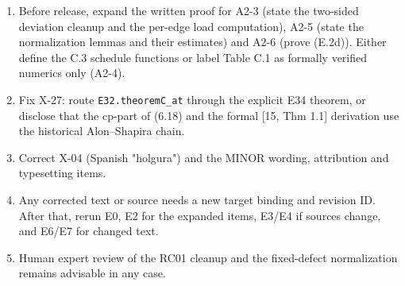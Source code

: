 \documentclass[
]{article}
\providecommand{\tightlist}{%
  \setlength{\itemsep}{0pt}\setlength{\parskip}{0pt}}
\begin{document}
\begin{enumerate}
\def\labelenumi{\arabic{enumi}.}
\tightlist
\item
  Before release, expand the written proof for A2-3 (state the two-sided
  deviation cleanup and the per-edge load computation), A2-5 (state the
  normalization lemmas and their estimates) and A2-6 (prove (E.2d)).
  Either define the C.3 schedule functions or label Table C.1 as
  formally verified numerics only (A2-4).
\item
  Fix X-27: route \texttt{E32.theoremC\_at} through the explicit E34
  theorem, or disclose that the cp-part of (6.18) and the formal {[}15,
  Thm 1.1{]} derivation use the historical Alon--Shapira chain.
\item
  Correct X-04 (Spanish "holgura") and the MINOR wording, attribution
  and typesetting items.
\item
  Any corrected text or source needs a new target binding and revision
  ID. After that, rerun E0, E2 for the expanded items, E3/E4 if sources
  change, and E6/E7 for changed text.
\item
  Human expert review of the RC01 cleanup and the fixed-defect
  normalization remains advisable in any case.
\end{enumerate}
\end{document}
